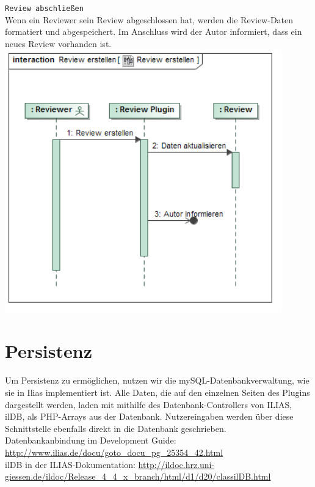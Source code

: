 \documentclass[a4paper]{scrreprt}
\begin{document}
\newpage
\texttt{Review abschließen}\\
Wenn ein Reviewer sein Review abgeschlossen hat, werden die Review-Daten formatiert und abgespeichert. Im Anschluss wird der Autor informiert, dass ein neues Review vorhanden ist.\\

\includegraphics[width=0.9\textwidth]{Sequence_Diagram__Review_erstellen__Review_erstellen.png}
\label{Review beenden}
\section{Persistenz}
Um Persistenz zu ermöglichen, nutzen wir die mySQL-Datenbankverwaltung, wie sie in Ilias implementiert ist. Alle Daten, die auf den einzelnen Seiten des Plugins dargestellt werden, laden mit mithilfe des Datenbank-Controllers von ILIAS, ilDB, als PHP-Arrays aus der Datenbank. Nutzereingaben werden über diese Schnittstelle ebenfalls direkt in die Datenbank geschrieben.\\
Datenbankanbindung im Development Guide: \url{http://www.ilias.de/docu/goto_docu_pg_25354_42.html}\\
ilDB in der ILIAS-Dokumentation: \url{http://ildoc.hrz.uni-giessen.de/ildoc/Release_4_4_x_branch/html/d1/d20/classilDB.html}
\end{document}
